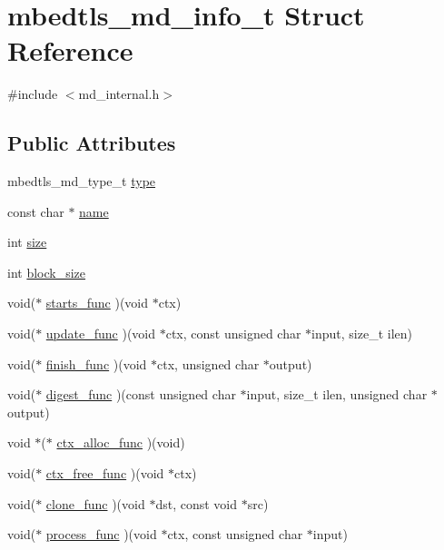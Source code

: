 \hypertarget{structmbedtls__md__info__t}{}\section{mbedtls\+\_\+md\+\_\+info\+\_\+t Struct Reference}
\label{structmbedtls__md__info__t}


{\ttfamily \#include $<$md\+\_\+internal.\+h$>$}

\subsection*{Public Attributes}
\begin{DoxyCompactItemize}
\item 
mbedtls\+\_\+md\+\_\+type\+\_\+t \mbox{\hyperlink{structmbedtls__md__info__t_ae27d588a1b1a7c4f96384fc5705f5c3d}{type}}
\item 
const char $\ast$ \mbox{\hyperlink{structmbedtls__md__info__t_a91340331832845c885d99884426d21c6}{name}}
\item 
int \mbox{\hyperlink{structmbedtls__md__info__t_a17a6641cfc5d4e7542d450463c4122f6}{size}}
\item 
int \mbox{\hyperlink{structmbedtls__md__info__t_a2090181c3aef5c7d692147340a6bdf99}{block\+\_\+size}}
\item 
void($\ast$ \mbox{\hyperlink{structmbedtls__md__info__t_a63f493cb3f21ba384544cc8094b98695}{starts\+\_\+func}} )(void $\ast$ctx)
\item 
void($\ast$ \mbox{\hyperlink{structmbedtls__md__info__t_ababa3afde569e7f97f86639bad8b91ef}{update\+\_\+func}} )(void $\ast$ctx, const unsigned char $\ast$input, size\+\_\+t ilen)
\item 
void($\ast$ \mbox{\hyperlink{structmbedtls__md__info__t_a5d5edae28954af967e8c3f85ed468926}{finish\+\_\+func}} )(void $\ast$ctx, unsigned char $\ast$output)
\item 
void($\ast$ \mbox{\hyperlink{structmbedtls__md__info__t_a64b2000256fe6384d3af30a1e2b20282}{digest\+\_\+func}} )(const unsigned char $\ast$input, size\+\_\+t ilen, unsigned char $\ast$output)
\item 
void $\ast$($\ast$ \mbox{\hyperlink{structmbedtls__md__info__t_ad14056b534fc7145cfb251c00786c2c0}{ctx\+\_\+alloc\+\_\+func}} )(void)
\item 
void($\ast$ \mbox{\hyperlink{structmbedtls__md__info__t_adc08407de7df014fc25e95cefb453073}{ctx\+\_\+free\+\_\+func}} )(void $\ast$ctx)
\item 
void($\ast$ \mbox{\hyperlink{structmbedtls__md__info__t_a8cba4e27132e91a692323e4503777543}{clone\+\_\+func}} )(void $\ast$dst, const void $\ast$src)
\item 
void($\ast$ \mbox{\hyperlink{structmbedtls__md__info__t_af5456d53add6cfe02fee1e3e4912ff05}{process\+\_\+func}} )(void $\ast$ctx, const unsigned char $\ast$input)
\end{DoxyCompactItemize}


